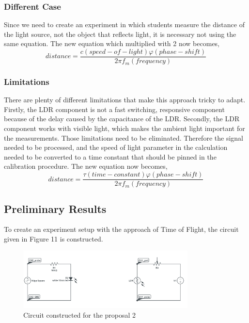 \documentclass[letterpaper,12pt]{article}
\begin{document}
\subsubsection{Different Case}
Since we need to create an experiment in which students measure the distance of the light source, not the object that reflects light, it is necessary not using the same equation. The new equation which multiplied with 2 now becomes,
\[distance = \frac{  c(speed-of-light)  \varphi (phase-shift)  }{2 \pi f_m (frequency)}\]

\subsubsection{Limitations}
There are plenty of different limitations that make this approach tricky to adapt. Firstly, the LDR component is not a fast switching, responsive component because of the delay caused by the capacitance of the LDR. Secondly, the LDR component works with visible light, which makes the ambient light important for the measurements. Those limitations need to be eliminated. Therefore the signal needed to be processed, and the speed of light parameter in the calculation needed to be converted to a time constant that should be pinned in the calibration procedure. The new equation now becomes,
\[distance = \frac{  \tau (time-constant)  \varphi (phase-shift)  }{2 \pi f_m (frequency)}\]

\subsection{Preliminary Results}
To create an experiment setup with the approach of Time of Flight, the circuit given in Figure 11 is constructed.
\begin{figure}[H]
	\centering
   \includegraphics[width=0.8\textwidth]{circuit2.png}
   \caption{Circuit constructed for the proposal 2}
\end{figure} 
\end{document}
